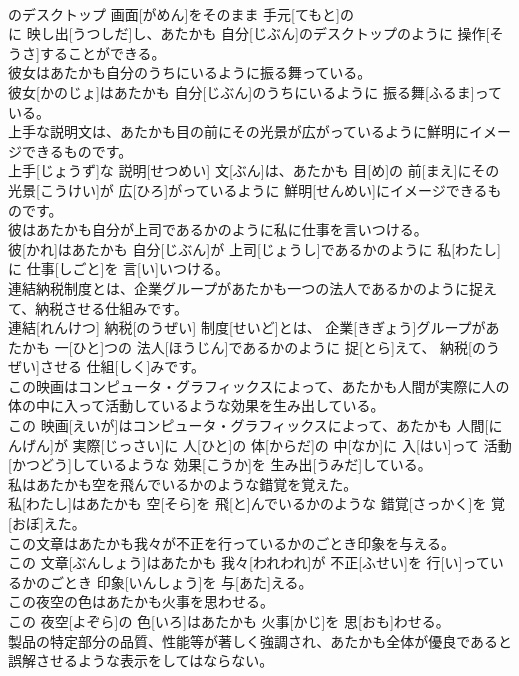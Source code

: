 \documentclass[8pt]{extreport}
\begin{document}
\begin{CJK}{UTF8}{min}
\\	のデスクトップ 画面[がめん]をそのまま 手元[てもと]の 
\\	に 映し出[うつしだ]し、あたかも 自分[じぶん]のデスクトップのように 操作[そうさ]することができる。
\\	彼女はあたかも自分のうちにいるように振る舞っている。	
\\	彼女[かのじょ]はあたかも 自分[じぶん]のうちにいるように 振る舞[ふるま]っている。
\\	上手な説明文は、あたかも目の前にその光景が広がっているように鮮明にイメージできるものです。	
\\	上手[じょうず]な 説明[せつめい] 文[ぶん]は、あたかも 目[め]の 前[まえ]にその 光景[こうけい]が 広[ひろ]がっているように 鮮明[せんめい]にイメージできるものです。
\\	彼はあたかも自分が上司であるかのように私に仕事を言いつける。	
\\	彼[かれ]はあたかも 自分[じぶん]が 上司[じょうし]であるかのように 私[わたし]に 仕事[しごと]を 言[い]いつける。
\\	連結納税制度とは、企業グループがあたかも一つの法人であるかのように捉えて、納税させる仕組みです。	
\\	連結[れんけつ] 納税[のうぜい] 制度[せいど]とは、 企業[きぎょう]グループがあたかも 一[ひと]つの 法人[ほうじん]であるかのように 捉[とら]えて、 納税[のうぜい]させる 仕組[しく]みです。
\\	この映画はコンピュータ・グラフィックスによって、あたかも人間が実際に人の体の中に入って活動しているような効果を生み出している。	
\\	この 映画[えいが]はコンピュータ・グラフィックスによって、あたかも 人間[にんげん]が 実際[じっさい]に 人[ひと]の 体[からだ]の 中[なか]に 入[はい]って 活動[かつどう]しているような 効果[こうか]を 生み出[うみだ]している。
\\	私はあたかも空を飛んでいるかのような錯覚を覚えた。	
\\	私[わたし]はあたかも 空[そら]を 飛[と]んでいるかのような 錯覚[さっかく]を 覚[おぼ]えた。
\\	この文章はあたかも我々が不正を行っているかのごとき印象を与える。	
\\	この 文章[ぶんしょう]はあたかも 我々[われわれ]が 不正[ふせい]を 行[い]っているかのごとき 印象[いんしょう]を 与[あた]える。
\\	この夜空の色はあたかも火事を思わせる。	
\\	この 夜空[よぞら]の 色[いろ]はあたかも 火事[かじ]を 思[おも]わせる。
\\	製品の特定部分の品質、性能等が著しく強調され、あたかも全体が優良であると誤解させるような表示をしてはならない。	

\end{CJK}
\end{document}
